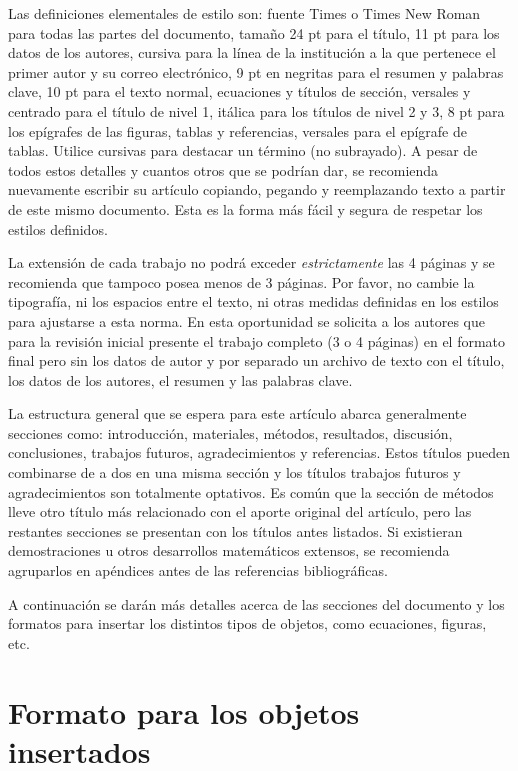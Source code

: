 \documentclass[conference,a4paper,10pt,oneside,final]{tfmpd}
\begin{document}
Las definiciones elementales de estilo son: fuente Times o Times New Roman para todas las partes del documento, tamaño 24 pt para el título, 11 pt para los datos de los autores, cursiva para la línea de la institución a la que pertenece el primer autor y su correo electrónico, 9 pt en negritas para el resumen y palabras clave, 10 pt para el texto normal, ecuaciones y títulos de sección, versales y centrado para el título de nivel 1, itálica para los títulos de nivel 2 y 3, 8 pt para los epígrafes de las figuras, tablas y referencias, versales para el epígrafe de tablas. Utilice cursivas para destacar un término (no subrayado). A pesar de todos estos detalles y cuantos otros que se podrían dar, se recomienda nuevamente escribir su artículo copiando, pegando y reemplazando texto a partir de este mismo documento. Esta es la forma más fácil y segura de respetar los estilos definidos.

La extensión de cada trabajo no podrá exceder \textit{estrictamente} las 4 páginas y se recomienda que tampoco posea menos de 3 páginas. Por favor, no cambie la tipografía, ni los espacios entre el texto, ni otras medidas definidas en los estilos para ajustarse a esta norma. En esta oportunidad se solicita a los autores que para la revisión inicial presente el trabajo completo (3 o 4 páginas) en el formato final pero sin los datos de autor y por separado un archivo de texto con el título, los datos de los autores, el resumen y las palabras clave.

La estructura general que se espera para este artículo abarca generalmente secciones como: introducción, materiales, métodos, resultados, discusión, conclusiones, trabajos futuros, agradecimientos y referencias. Estos títulos pueden combinarse de a dos en una misma sección y los títulos trabajos futuros y agradecimientos son totalmente optativos. Es común que la sección de métodos lleve otro título más relacionado con el aporte original del artículo, pero las restantes secciones se presentan con los títulos antes listados. Si existieran demostraciones u otros desarrollos matemáticos extensos, se recomienda agruparlos en apéndices antes de las referencias bibliográficas.

A continuación se darán más detalles acerca de las secciones del documento y los formatos para insertar los distintos tipos de objetos, como ecuaciones, figuras, etc.

\section{Formato para los objetos insertados}
\end{document}
